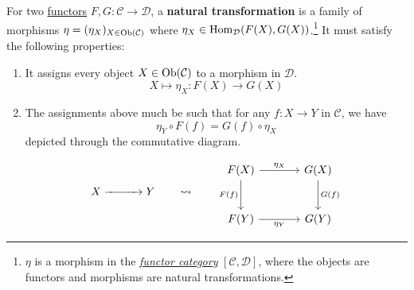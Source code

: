 	\begin{definition}
	  \label{def:natural-transformation}
		For two \hyperref[def:functor]{functors} $F, G: \mathcal{C} \to \mathcal{D}$, a \textbf{natural transformation} is a family of morphisms $\eta = (\eta_X)_{X \in \operatorname{Ob}(\mathcal{C})}$ where $\eta_X \in \operatorname{Hom}_{\mathcal{D}}(F(X), G(X))$.\footnote{$\eta$ is a morphism in the \textit{\hyperref[def:functor-category]{functor category}} $[\mathcal{C}, \mathcal{D}]$, where the objects are functors and morphisms are natural transformations.} It must satisfy the following properties: 
		\begin{enumerate}
			\item It assigns every object $X \in \operatorname{Ob}(\mathcal{C})$ to a morphism in $\mathcal{D}$. 
				\begin{equation}
				  X \mapsto \eta_X : F(X) \to G(X)
				\end{equation}
			\item The assignments above much be such that for any $f: X \to Y$ in $\mathcal{C}$, we have 
				\begin{equation}
				  \eta_Y \circ F(f) = G(f) \circ \eta_X
				\end{equation}
				depicted through the commutative diagram. 

				\begin{equation}
				  X \xrightarrow{\hspace{1cm}} Y
				  \qquad \rightsquigarrow \qquad
				  \begin{tikzcd}[column sep=large, row sep=large]
				  	F(X) \arrow[r, "\eta_X"] \arrow[d, "F(f)"']
				  	& G(X) \arrow[d, "G(f)"] \\
				  	F(Y) \arrow[r, "\eta_Y"']
				  	& G(Y)
				  \end{tikzcd}
				\end{equation}
		\end{enumerate}
	\end{definition}

